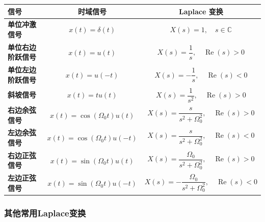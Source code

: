\documentclass[UTF8,fontset=fandol,zihao=5]{ctexart}
\newcommand{\CC}{\mathbb{C}}
\begin{document}
\begin{center}
\begin{table}[H]
  \centering
  \begin{tabularx}{\textwidth}{>{\bfseries}p{3cm} c c}
    \toprule
    信号 & 时域信号 & Laplace 变换 \\
    \midrule
    单位冲激信号 & $x(t)=\delta(t)$
      & $X(s)=1,\quad s\in\CC$ \\

    单位右边阶跃信号 & $x(t)=u(t)$
      & $X(s)=\dfrac{1}{s},\quad \operatorname{Re}(s)>0$ \\

    单位左边阶跃信号 & $x(t)=u(-t)$
      & $X(s)=-\dfrac{1}{s},\quad \operatorname{Re}(s)<0$ \\

    斜坡信号 & $x(t)=tu(t)$
      & $X(s)=\dfrac{1}{s^2},\quad \operatorname{Re}(s)>0$ \\

    右边余弦信号 & $x(t)=\cos(\varOmega_0t)u(t)$
      & $X(s)=\dfrac{s}{s^2+\varOmega_0^2},
        \quad \operatorname{Re}(s)>0$ \\

    左边余弦信号 & $x(t)=\cos(\varOmega_0t)u(-t)$
      & $X(s)=\dfrac{s}{s^2+\varOmega_0^2},
        \quad \operatorname{Re}(s)<0$ \\

    右边正弦信号 & $x(t)=\sin(\varOmega_0t)u(t)$
      & $X(s)=\dfrac{\varOmega_0}{s^2+\varOmega_0^2},
        \quad \operatorname{Re}(s)>0$ \\

    左边正弦信号 & $x(t)=\sin(\varOmega_0t)u(-t)$
      & $X(s)=-\dfrac{\varOmega_0}{s^2+\varOmega_0^2},
        \quad \operatorname{Re}(s)<0$ \\
    \bottomrule
  \end{tabularx}
\end{table}
\end{center}

\subsubsection{其他常用Laplace变换}
\end{document}
